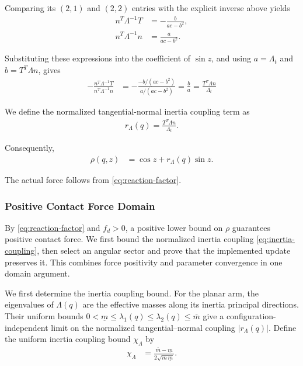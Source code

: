 \documentclass[10pt,journal,letterpaper]{IEEEtran}
\begin{document}
Comparing its $(2,1)$ and $(2,2)$ entries with the explicit inverse above yields
\begin{align*}
n^T\Lambda^{-1}T&=-\frac{b}{ac-b^2},\\
n^T\Lambda^{-1}n&=\frac{a}{ac-b^2}.
\end{align*}

Substituting these expressions into the coefficient of $\sin z$, and using $a=\Lambda_t$ and $b=T^T\Lambda n$, gives
\begin{align*}
-\frac{n^T\Lambda^{-1}T}{n^T\Lambda^{-1}n}
&=-\frac{-b/(ac-b^2)}{a/(ac-b^2)}
=\frac{b}{a}
=\frac{T^T\Lambda n}{\Lambda_t}
\end{align*}

We define the normalized tangential-normal inertia coupling term as
\begin{equation}\label{eq:inertia-coupling}
\begin{aligned}
r_\Lambda(q)=\frac{T^T\Lambda n}{\Lambda_t}.
\end{aligned}
\end{equation}

Consequently,
\begin{equation}\label{eq:force-factor}
\begin{aligned}
\rho(q,z)&=\cos z+r_\Lambda(q)\sin z.
\end{aligned}
\end{equation}

The actual force follows from \eqref{eq:reaction-factor}.

\subsubsection{Positive Contact Force Domain}

By \eqref{eq:reaction-factor} and $f_d>0$, a positive lower bound on $\rho$ guarantees positive contact force. We first bound the normalized inertia coupling \eqref{eq:inertia-coupling}, then select an angular sector and prove that the implemented update preserves it. This combines force positivity and parameter convergence in one domain argument.

We first determine the inertia coupling bound. For the planar arm, the eigenvalues of $\Lambda(q)$ are the effective masses along its inertia principal directions. Their uniform bounds $0<\underline m\leq\lambda_1(q)\leq\lambda_2(q)\leq\overline m$ give a configuration-independent limit on the normalized tangential--normal coupling $|r_\Lambda(q)|$. Define the uniform inertia coupling bound $\chi_\Lambda$ by
\begin{equation}\label{eq:coupling-constant}
\begin{aligned}
\chi_\Lambda
&=\frac{\overline m-\underline m}{2\sqrt{\overline m\,\underline m}}.
\end{aligned}
\end{equation}
\end{document}
